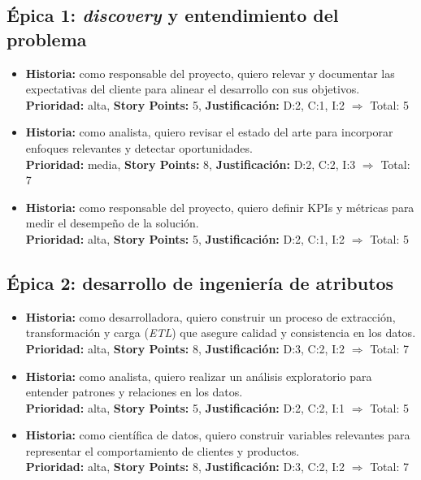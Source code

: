 \documentclass[
11pt, %
]{charter}
\begin{document}
\subsection*{\'Epica 1: \textit{discovery} y entendimiento del problema}
\begin{itemize}
  \item \textbf{Historia:} como responsable del proyecto, quiero relevar y documentar las expectativas del cliente para alinear el desarrollo con sus objetivos.\\
  \textbf{Prioridad:} alta, \textbf{Story Points:} 5, \textbf{Justificación:} D:2, C:1, I:2 $\Rightarrow$ Total: 5

  \item \textbf{Historia:} como analista, quiero revisar el estado del arte para incorporar enfoques relevantes y detectar oportunidades.\\
  \textbf{Prioridad:} media, \textbf{Story Points:} 8, \textbf{Justificación:} D:2, C:2, I:3 $\Rightarrow$ Total: 7

  \item \textbf{Historia:} como responsable del proyecto, quiero definir KPIs y métricas para medir el desempeño de la solución.\\
  \textbf{Prioridad:} alta, \textbf{Story Points:} 5, \textbf{Justificación:} D:2, C:1, I:2 $\Rightarrow$ Total: 5
\end{itemize}

\subsection*{\'Epica 2: desarrollo de ingeniería de atributos}
\begin{itemize}
  \item \textbf{Historia:} como desarrolladora, quiero construir un proceso de extracción, transformación y carga (\textit{ETL}) que asegure calidad y consistencia en los datos.\\
  \textbf{Prioridad:} alta, \textbf{Story Points:} 8, \textbf{Justificación:} D:3, C:2, I:2 $\Rightarrow$ Total: 7

  \item \textbf{Historia:} como analista, quiero realizar un análisis exploratorio para entender patrones y relaciones en los datos.\\
  \textbf{Prioridad:} alta, \textbf{Story Points:} 5, \textbf{Justificación:} D:2, C:2, I:1 $\Rightarrow$ Total: 5

  \item \textbf{Historia:} como científica de datos, quiero construir variables relevantes para representar el comportamiento de clientes y productos.\\
  \textbf{Prioridad:} alta, \textbf{Story Points:} 8, \textbf{Justificación:} D:3, C:2, I:2 $\Rightarrow$ Total: 7
\end{itemize}
\end{document}
